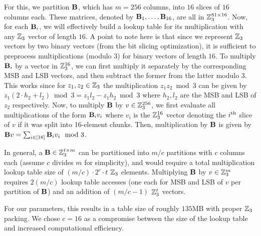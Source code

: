 For this, we partition $\mat{B}$, which has $m=256$ columns, into $16$ slices of $16$ columns each. These matrices, denoted by $\mat{B}_1,\dots, \mat{B}_{16}$, are all in $\mathbb{Z}_3^{81 \times 16}$. Now, for each $\mat{B}_i$, we will effectively build a lookup table for its multiplication with any $\mathbb{Z}_3$ vector of length $16$. A point to note here is that since we  represent $\mathbb{Z}_3$ vectors by two binary vectors (from the bit slicing optimization), it is sufficient to preprocess multiplications (modulo 3) for binary vectors of length $16$. To multiply $\mat{B}_{i}$ by a vector in $\mathbb{Z}_3^{16}$, we can first multiply it separately by the corresponding MSB and LSB vectors, and then subtract the former from the latter modulo 3. This works since for $z_1, z_2 \in \mathbb{Z}_3$ the multiplication $z_1z_2 \bmod 3$ can be given by $z_1(2\cdot h_2 + l_2) \bmod 3 = z_1l_2 - z_1h_2 \bmod 3$ where $h_2, l_2$ are the MSB and LSB of $z_2$ respectively. Now, to multiply $\mat{B}$ by $v \in \mathbb{Z}_3^{256}$, we first evaluate all multiplications of the form $\mat{B}_iv_i$ where $v_i$ is the $\mathbb{Z}_3^{16}$ vector denoting the $i^{\textnormal{th}}$ slice of $v$ if it was split into 16-element chunks. Then, multiplication by $\mat{B}$ is given by $\mat{B}v = \sum_{i \in [16]} \mat{B}_i v_i \mod 3$.

In general, a $\mat{B} \in \Z_3^{t \times m}$ can be partitioned into $m/c$ partitions with $c$ columns each (assume $c$ divides $m$ for simplicity), and would require a total multiplication lookup table size of $(m/c) \cdot 2^c \cdot t$ $\mathbb{Z}_3$ elements. Multiplying $\mat{B}$ by $v \in \mathbb{Z}_3^{m}$ requires $2(m/c)$ lookup table accesses (one each for MSB and LSB of $v$ per partition of $\mat{B}$) and an addition of $(m/c - 1)$ $\mathbb{Z}_3^{t}$ vectors.


For our parameters, this results in a table size of roughly $135$MB with proper $\mathbb{Z}_3$ packing. We chose $c = 16$ as a compromise between the size of the lookup table and increased computational efficiency.


\fi









